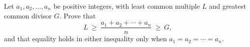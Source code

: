 Let $a_1,a_2,\dots,a_n$ be positive integers, with least common multiple $L$ and greatest common divisor $G$. Prove that
\[
L\ \ge\ \dfrac{a_1+a_2+\cdots+a_n}{n}\ \ge\ G,
\]
and that equality holds in either inequality only when $a_1=a_2=\cdots=a_n$.
